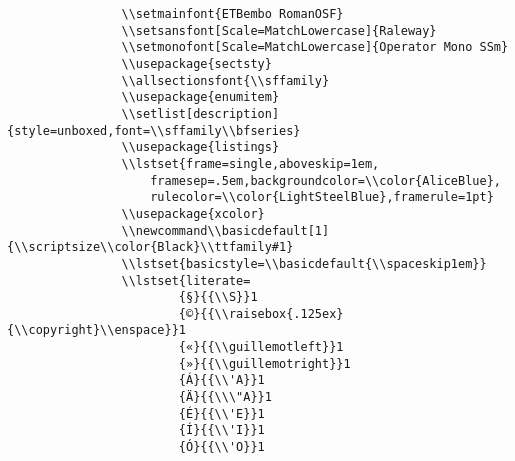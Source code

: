 \documentclass[11pt]{article}
\begin{document}
\begin{verbatim}
                \\setmainfont{ETBembo RomanOSF}
                \\setsansfont[Scale=MatchLowercase]{Raleway}
                \\setmonofont[Scale=MatchLowercase]{Operator Mono SSm}
                \\usepackage{sectsty}
                \\allsectionsfont{\\sffamily}
                \\usepackage{enumitem}
                \\setlist[description]{style=unboxed,font=\\sffamily\\bfseries}
                \\usepackage{listings}
                \\lstset{frame=single,aboveskip=1em,
                    framesep=.5em,backgroundcolor=\\color{AliceBlue},
                    rulecolor=\\color{LightSteelBlue},framerule=1pt}
                \\usepackage{xcolor}
                \\newcommand\\basicdefault[1]{\\scriptsize\\color{Black}\\ttfamily#1}
                \\lstset{basicstyle=\\basicdefault{\\spaceskip1em}}
                \\lstset{literate=
                        {§}{{\\S}}1
                        {©}{{\\raisebox{.125ex}{\\copyright}\\enspace}}1
                        {«}{{\\guillemotleft}}1
                        {»}{{\\guillemotright}}1
                        {Á}{{\\'A}}1
                        {Ä}{{\\\"A}}1
                        {É}{{\\'E}}1
                        {Í}{{\\'I}}1
                        {Ó}{{\\'O}}1

\end{verbatim}
\end{document}
